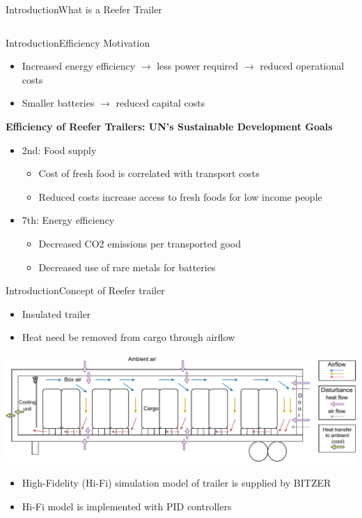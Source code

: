 \begin{frame}{Introduction}{What is a Reefer Trailer}
\begin{columns}
\begin{column}{.5\textwidth}
 		\end{column}
 	\end{columns}	
\end{frame}


\begin{frame}{Introduction}{Efficiency Motivation}
	\begin{itemize}
		\item Increased energy efficiency $\rightarrow$ less power required $\rightarrow$ reduced operational costs  
		\item Smaller batteries $\rightarrow$ reduced capital costs		
	\end{itemize}\bigskip
	\textbf{Efficiency of Reefer Trailers: UN's Sustainable Development Goals}
	\begin{itemize}	
		\item 2nd: Food supply
		\begin{itemize}
			\item Cost of fresh food is correlated with transport costs
			\item Reduced costs increase access to fresh foods for low income people		
		\end{itemize}
		\item 7th: Energy efficiency
		\begin{itemize}
			\item Decreased CO2 emissions per transported good
			\item Decreased use of rare metals for batteries	
		\end{itemize}
	\end{itemize}	
\end{frame}

\begin{frame}{Introduction}{Concept of Reefer trailer}
	\begin{itemize}
		\item Insulated trailer
		\item Heat need be removed from cargo through airflow	
	\end{itemize}
	\includegraphics[width=1\textwidth]{../Graphics/Trailer_airflow.pdf}
	\begin{itemize}
		\item High-Fidelity (Hi-Fi) simulation model of trailer is supplied by BITZER
		\item Hi-Fi model is implemented with PID controllers
	\end{itemize}
\end{frame}

